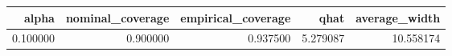 \begin{tabular}{rrrrr}
\toprule
alpha & nominal\_coverage & empirical\_coverage & qhat & average\_width \\
\midrule
0.100000 & 0.900000 & 0.937500 & 5.279087 & 10.558174 \\
\bottomrule
\end{tabular}
